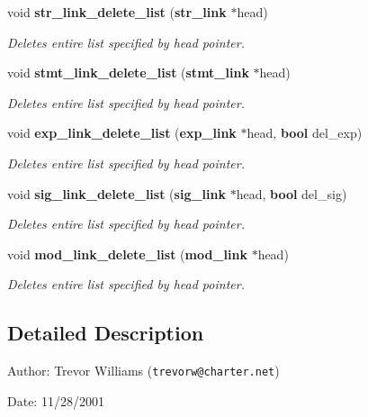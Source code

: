 \begin{CompactItemize}
void {\bf str\_\-link\_\-delete\_\-list} ({\bf str\_\-link} $\ast$head)
\begin{CompactList}\small\item\em Deletes entire list specified by head pointer. \item\end{CompactList}\item 
void {\bf stmt\_\-link\_\-delete\_\-list} ({\bf stmt\_\-link} $\ast$head)
\begin{CompactList}\small\item\em Deletes entire list specified by head pointer. \item\end{CompactList}\item 
void {\bf exp\_\-link\_\-delete\_\-list} ({\bf exp\_\-link} $\ast$head, {\bf bool} del\_\-exp)
\begin{CompactList}\small\item\em Deletes entire list specified by head pointer. \item\end{CompactList}\item 
void {\bf sig\_\-link\_\-delete\_\-list} ({\bf sig\_\-link} $\ast$head, {\bf bool} del\_\-sig)
\begin{CompactList}\small\item\em Deletes entire list specified by head pointer. \item\end{CompactList}\item 
void {\bf mod\_\-link\_\-delete\_\-list} ({\bf mod\_\-link} $\ast$head)
\begin{CompactList}\small\item\em Deletes entire list specified by head pointer. \item\end{CompactList}\end{CompactItemize}


\subsection{Detailed Description}
\begin{Desc}
\item[Author:]Trevor Williams ({\tt trevorw@charter.net}) \end{Desc}
\begin{Desc}
\item[Date:]11/28/2001\end{Desc}


